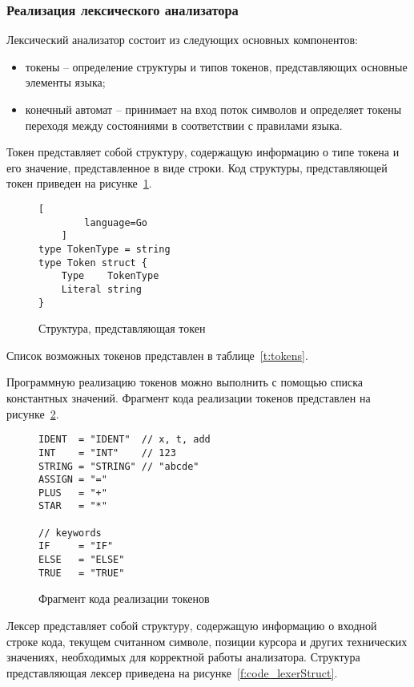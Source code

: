 \subsubsection{Реализация лексического анализатора}

Лексический анализатор состоит из следующих основных компонентов:
\begin{itemize}
    \item токены -- определение структуры и типов токенов, представляющих основные элементы языка;
    \item конечный автомат -- принимает на вход поток символов и определяет токены переходя между состояниями в соответствии с правилами языка.
\end{itemize}

Токен представляет собой структуру, содержащую информацию о типе токена и его значение, представленное в виде строки.
Код структуры, представляющей токен приведен на рисунке~\ref{f:code_tokenStruct}.

\begin{figure}[ht]
	\centering
	\vspace{\toppaddingoffigure}
	\begin{lstlisting}[
        language=Go
    ]
type TokenType = string
type Token struct {
    Type    TokenType
    Literal string
}        
\end{lstlisting}
	\caption{Структура, представляющая токен}
	\label{f:code_tokenStruct}
\end{figure}

Список возможных токенов представлен в таблице~\ref{t:tokens}.

Программную реализацию токенов можно выполнить с помощью списка константных значений.
Фрагмент кода реализации токенов представлен на рисунке~\ref{f:code_tokensFragemnt}.

\begin{figure}[ht]
	\centering
	\vspace{\toppaddingoffigure}
	\begin{lstlisting}
IDENT  = "IDENT"  // x, t, add
INT    = "INT"    // 123
STRING = "STRING" // "abcde"
ASSIGN = "="
PLUS   = "+"
STAR   = "*"

// keywords
IF     = "IF"
ELSE   = "ELSE"
TRUE   = "TRUE"    
\end{lstlisting}
	\caption{Фрагмент кода реализации токенов}
	\label{f:code_tokensFragemnt}
\end{figure}

Лексер представляет собой структуру, содержащую информацию о входной строке кода,
текущем считанном символе, позиции курсора и других технических значениях, необходимых для корректной работы анализатора.
Структура представляющая лексер приведена на рисунке~\ref{f:code_lexerStruct}.

